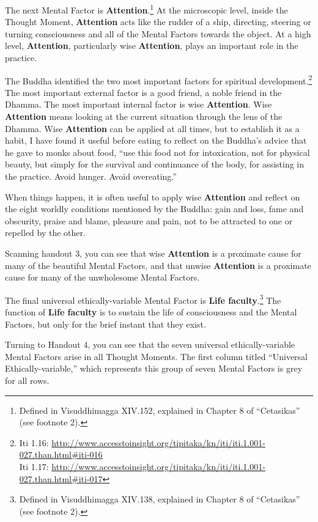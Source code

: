 The next Mental Factor is \textbf{Attention}.\footnote{Defined in Visuddhimagga XIV.152, explained in Chapter 8 of “Cetasikas” (see footnote 2).} At the microscopic level, inside the Thought Moment, \textbf{Attention} acts like the rudder of a ship, directing, steering or turning consciousness and all of the Mental Factors towards the object. At a high level, \textbf{Attention}, particularly wise \textbf{Attention}, plays an important role in the practice.

The Buddha identified the two most important factors for spiritual development.\footnote{Iti 1.16: \url{http://www.accesstoinsight.org/tipitaka/kn/iti/iti.1.001-027.than.html\#iti-016}\\Iti 1.17: \url{http://www.accesstoinsight.org/tipitaka/kn/iti/iti.1.001-027.than.html\#iti-017}} The most important external factor is a good friend, a noble friend in the Dhamma. The most important internal factor is wise \textbf{Attention}. Wise \textbf{Attention} means looking at the current situation through the lens of the Dhamma. Wise \textbf{Attention} can be applied at all times, but to establish it as a habit, I have found it useful before eating to reflect on the Buddha’s advice that he gave to monks about food, “use this food not for intoxication, not for physical beauty, but simply for the survival and continuance of the body, for assisting in the practice. Avoid hunger. Avoid overeating.”

When things happen, it is often useful to apply wise \textbf{Attention} and reflect on the eight worldly conditions mentioned by the Buddha: gain and loss, fame and obscurity, praise and blame, pleasure and pain, not to be attracted to one or repelled by the other.

Scanning handout 3, you can see that wise \textbf{Attention} is a proximate cause for many of the beautiful Mental Factors, and that unwise \textbf{Attention} is a proximate cause for many of the unwholesome Mental Factors.

The final universal ethically-variable Mental Factor is \textbf{Life faculty}.\footnote{Defined in Visuddhimagga XIV.138, explained in Chapter 8 of “Cetasikas” (see footnote 2).} The function of \textbf{Life faculty} is to sustain the life of consciousness and the Mental Factors, but only for the brief instant that they exist.

Turning to Handout 4, you can see that the seven universal ethically-variable Mental Factors arise in all Thought Moments. The first column titled “Universal Ethically-variable,” which represents this group of seven Mental Factors is grey for all rows.


